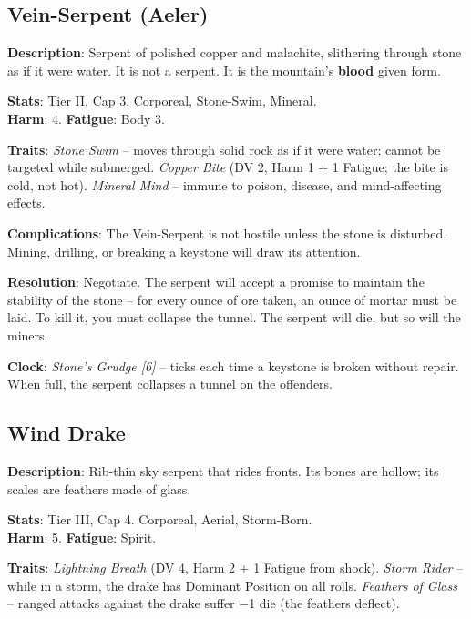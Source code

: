 \subsection*{Vein-Serpent (Aeler)}

\noindent\textbf{Description}: Serpent of polished copper and malachite, slithering through stone as if it were water. It is not a serpent. It is the mountain's \textbf{blood} given form.

\noindent\textbf{Stats}: Tier II, Cap 3. Corporeal, Stone-Swim, Mineral.\\
\textbf{Harm}: 4. \textbf{Fatigue}: Body 3.

\noindent\textbf{Traits}: 
\emph{Stone Swim} -- moves through solid rock as if it were water; cannot be targeted while submerged. \emph{Copper Bite} (DV 2, Harm 1 + 1 Fatigue; the bite is cold, not hot). \emph{Mineral Mind} -- immune to poison, disease, and mind-affecting effects.

\noindent\textbf{Complications}: The Vein-Serpent is not hostile unless the stone is disturbed. Mining, drilling, or breaking a keystone will draw its attention.

\noindent\textbf{Resolution}: Negotiate. The serpent will accept a promise to maintain the stability of the stone -- for every ounce of ore taken, an ounce of mortar must be laid. To kill it, you must collapse the tunnel. The serpent will die, but so will the miners.

\noindent\textbf{Clock}: \emph{Stone's Grudge [6]} -- ticks each time a keystone is broken without repair. When full, the serpent collapses a tunnel on the offenders.


\subsection*{Wind Drake}

\noindent\textbf{Description}: Rib-thin sky serpent that rides fronts. Its bones are hollow; its scales are feathers made of glass.

\noindent\textbf{Stats}: Tier III, Cap 4. Corporeal, Aerial, Storm-Born.\\
\textbf{Harm}: 5. \textbf{Fatigue}: Spirit.

\noindent\textbf{Traits}: 
\emph{Lightning Breath} (DV 4, Harm 2 + 1 Fatigue from shock). \emph{Storm Rider} -- while in a storm, the drake has Dominant Position on all rolls. \emph{Feathers of Glass} -- ranged attacks against the drake suffer −1 die (the feathers deflect).

